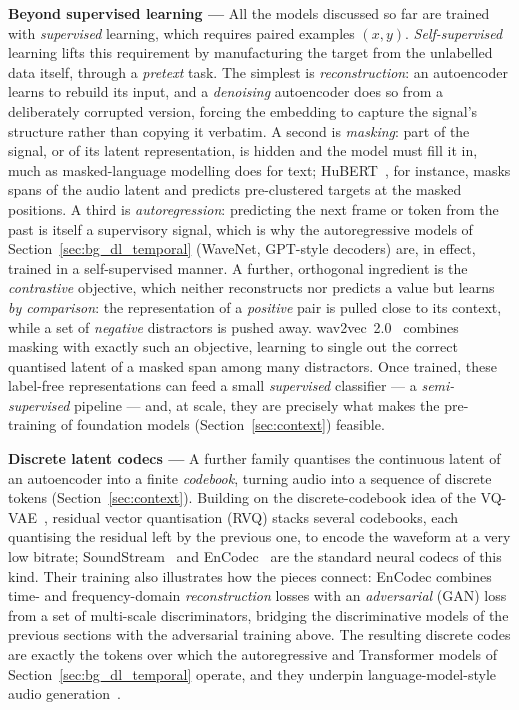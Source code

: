 \textbf{Beyond supervised learning ---} All the models discussed so far
are trained with \emph{supervised} learning, which requires paired
examples $(x, y)$. \emph{Self-supervised} learning lifts this requirement
by manufacturing the target from the unlabelled data itself, through a
\emph{pretext} task. The simplest is \emph{reconstruction}: an autoencoder learns to rebuild
its input, and a \emph{denoising} autoencoder does so from a deliberately
corrupted version, forcing the embedding to capture the signal's
structure rather than copying it verbatim. A second is \emph{masking}: part of the signal, or of its latent representation, is hidden and the model must fill it in, much as
masked-language modelling does for text; HuBERT~\citep{hsu2021hubert}, for
instance, masks spans of the audio latent and predicts pre-clustered
targets at the masked positions. A third is \emph{autoregression}: predicting the next frame or token from the past is itself a supervisory
signal, which is why the autoregressive models of
Section~\ref{sec:bg_dl_temporal} (WaveNet, GPT-style decoders)
are, in effect, trained in a self-supervised manner. A further,
orthogonal ingredient is the \emph{contrastive} objective, which neither
reconstructs nor predicts a value but learns \emph{by comparison}: the
representation of a \emph{positive} pair is pulled close to its context, while a set
of \emph{negative} distractors is pushed away. wav2vec~2.0~\citep{baevski2020wav2vec2} combines masking
with exactly such an objective, learning to single out the correct
quantised latent of a masked span among many distractors. Once trained,
these label-free representations can feed a small \emph{supervised}
classifier --- a \emph{semi-supervised} pipeline --- and, at scale,
they are precisely what
makes the pre-training of foundation models (Section~\ref{sec:context})
feasible.

\textbf{Discrete latent codecs ---} A further family quantises the
continuous latent of an autoencoder into a finite \emph{codebook}, turning
audio into a sequence of discrete tokens (Section~\ref{sec:context}).
Building on the discrete-codebook idea of the VQ-VAE~\citep{oord2017neural},
residual vector quantisation (RVQ) stacks several codebooks, each
quantising the residual left by the previous one, to encode the waveform
at a very low bitrate; SoundStream~\citep{zeghidour2021soundstream} and
EnCodec~\citep{defossez2022high} are the standard neural codecs of this
kind. Their training also illustrates how the pieces connect: EnCodec
combines time- and frequency-domain \emph{reconstruction} losses with an
\emph{adversarial} (\acrshort{GAN}) loss from a set of multi-scale
discriminators, bridging the discriminative models of the previous
sections with the adversarial training above. The resulting discrete codes
are exactly the tokens over which the autoregressive and Transformer
models of Section~\ref{sec:bg_dl_temporal} operate, and they underpin
language-model-style audio generation~\citep{borsos2023audiolm}.


